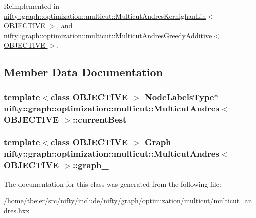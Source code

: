Reimplemented in \hyperlink{classnifty_1_1graph_1_1optimization_1_1multicut_1_1MulticutAndresKernighanLin_ad5ae9a56d69e579953b0e5e209694a46}{nifty\+::graph\+::optimization\+::multicut\+::\+Multicut\+Andres\+Kernighan\+Lin$<$ O\+B\+J\+E\+C\+T\+I\+V\+E $>$}, and \hyperlink{classnifty_1_1graph_1_1optimization_1_1multicut_1_1MulticutAndresGreedyAdditive_ac7fe8288460dba66d9f570edb47dc82d}{nifty\+::graph\+::optimization\+::multicut\+::\+Multicut\+Andres\+Greedy\+Additive$<$ O\+B\+J\+E\+C\+T\+I\+V\+E $>$}.



\subsection{Member Data Documentation}
\hypertarget{classnifty_1_1graph_1_1optimization_1_1multicut_1_1MulticutAndres_ac5ff8ecc2f1b750d063b1deee34db9be}{}
\subsubsection[{current\+Best\+\_\+}]{\setlength{\rightskip}{0pt plus 5cm}template$<$class O\+B\+J\+E\+C\+T\+I\+V\+E $>$ {\bf Node\+Labels\+Type}$\ast$ {\bf nifty\+::graph\+::optimization\+::multicut\+::\+Multicut\+Andres}$<$ O\+B\+J\+E\+C\+T\+I\+V\+E $>$\+::current\+Best\+\_\+\hspace{0.3cm}{\ttfamily [protected]}}\label{classnifty_1_1graph_1_1optimization_1_1multicut_1_1MulticutAndres_ac5ff8ecc2f1b750d063b1deee34db9be}
\hypertarget{classnifty_1_1graph_1_1optimization_1_1multicut_1_1MulticutAndres_a80f20b9e88a4d6460729ca5b16bd2a0a}{}
\subsubsection[{graph\+\_\+}]{\setlength{\rightskip}{0pt plus 5cm}template$<$class O\+B\+J\+E\+C\+T\+I\+V\+E $>$ {\bf Graph} {\bf nifty\+::graph\+::optimization\+::multicut\+::\+Multicut\+Andres}$<$ O\+B\+J\+E\+C\+T\+I\+V\+E $>$\+::graph\+\_\+\hspace{0.3cm}{\ttfamily [protected]}}\label{classnifty_1_1graph_1_1optimization_1_1multicut_1_1MulticutAndres_a80f20b9e88a4d6460729ca5b16bd2a0a}


The documentation for this class was generated from the following file\+:\begin{DoxyCompactItemize}
\item 
/home/tbeier/src/nifty/include/nifty/graph/optimization/multicut/\hyperlink{multicut__andres_8hxx}{multicut\+\_\+andres.\+hxx}\end{DoxyCompactItemize}
